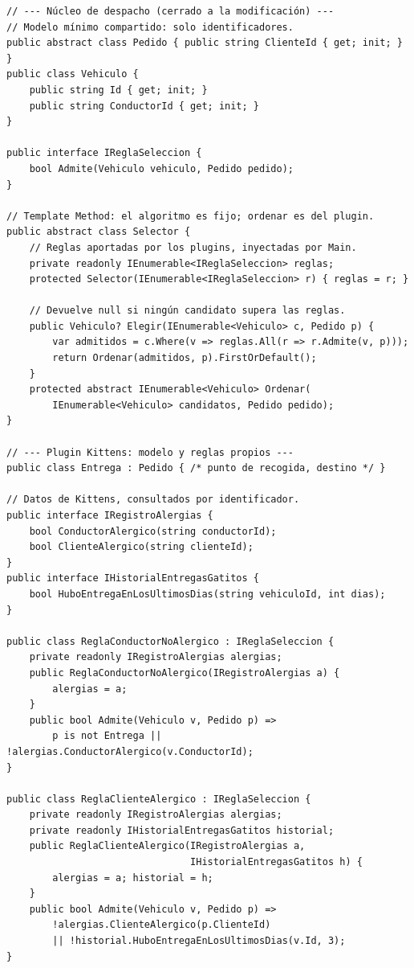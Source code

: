\par{} \ifdim\dimexpr\pagegoal-\pagetotal\relax<8\baselineskip\newpage\fi
\begin{lstlisting}[style=codigo, language={[Sharp]C},
  caption={Esbozo en estilo C\# del punto de extensión del núcleo y de las reglas que aporta el \emph{plugin} \texttt{Kittens}.},
  label={lst:p5-reglas}]
// --- Núcleo de despacho (cerrado a la modificación) ---
// Modelo mínimo compartido: solo identificadores.
public abstract class Pedido { public string ClienteId { get; init; } }
public class Vehiculo {
    public string Id { get; init; }
    public string ConductorId { get; init; }
}

public interface IReglaSeleccion {
    bool Admite(Vehiculo vehiculo, Pedido pedido);
}

// Template Method: el algoritmo es fijo; ordenar es del plugin.
public abstract class Selector {
    // Reglas aportadas por los plugins, inyectadas por Main.
    private readonly IEnumerable<IReglaSeleccion> reglas;
    protected Selector(IEnumerable<IReglaSeleccion> r) { reglas = r; }

    // Devuelve null si ningún candidato supera las reglas.
    public Vehiculo? Elegir(IEnumerable<Vehiculo> c, Pedido p) {
        var admitidos = c.Where(v => reglas.All(r => r.Admite(v, p)));
        return Ordenar(admitidos, p).FirstOrDefault();
    }
    protected abstract IEnumerable<Vehiculo> Ordenar(
        IEnumerable<Vehiculo> candidatos, Pedido pedido);
}

// --- Plugin Kittens: modelo y reglas propios ---
public class Entrega : Pedido { /* punto de recogida, destino */ }

// Datos de Kittens, consultados por identificador.
public interface IRegistroAlergias {
    bool ConductorAlergico(string conductorId);
    bool ClienteAlergico(string clienteId);
}
public interface IHistorialEntregasGatitos {
    bool HuboEntregaEnLosUltimosDias(string vehiculoId, int dias);
}

public class ReglaConductorNoAlergico : IReglaSeleccion {
    private readonly IRegistroAlergias alergias;
    public ReglaConductorNoAlergico(IRegistroAlergias a) {
        alergias = a;
    }
    public bool Admite(Vehiculo v, Pedido p) =>
        p is not Entrega || !alergias.ConductorAlergico(v.ConductorId);
}

public class ReglaClienteAlergico : IReglaSeleccion {
    private readonly IRegistroAlergias alergias;
    private readonly IHistorialEntregasGatitos historial;
    public ReglaClienteAlergico(IRegistroAlergias a,
                                IHistorialEntregasGatitos h) {
        alergias = a; historial = h;
    }
    public bool Admite(Vehiculo v, Pedido p) =>
        !alergias.ClienteAlergico(p.ClienteId)
        || !historial.HuboEntregaEnLosUltimosDias(v.Id, 3);
}
\end{lstlisting}

